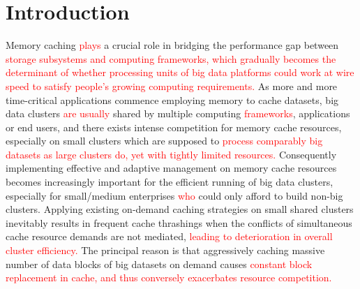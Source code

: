 \section{Introduction}\label{sec:Introduction}


Memory caching \textcolor{red}{plays} a crucial role in bridging the performance gap between \textcolor{red}{storage subsystems and computing frameworks, which gradually becomes the determinant of whether processing units of big data platforms could work at wire speed to satisfy people's growing computing requirements.}
As more and more time-critical applications commence employing memory to cache datasets, big data clusters \textcolor{red}{are usually} shared by multiple computing \textcolor{red}{frameworks}, applications or end users, and  there exists intense competition for memory cache resources, especially on small clusters which are supposed to 
\textcolor{red}{process comparably big datasets as large clusters do, yet with tightly limited resources.}
Consequently implementing effective and adaptive management on memory cache resources becomes increasingly important for the efficient running of big data clusters, especially for small/medium enterprises \textcolor{red}{who} could only afford to build non-big clusters. Applying existing on-demand caching strategies on small shared clusters inevitably results in frequent cache thrashings when the conflicts of simultaneous cache resource demands are not mediated, \textcolor{red}{leading to deterioration in overall cluster efficiency.}
The principal reason is that aggressively caching massive number of data blocks of big datasets on demand causes \textcolor{red}{constant block replacement in cache, and thus conversely exacerbates resource competition.}


